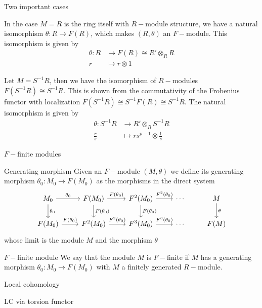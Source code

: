 \documentclass{beamer}
\begin{document}
\begin{frame}[fragile]{Two important cases}
\begin{block}{}
  In the case $M=R$ is the ring itself with  $R-$module structure, we have a natural isomorphism  $\theta : R \to F(R)$, which makes $(R, \theta )$ an $F-$module. This isomorphism is given by
  \begin{align*}
	\theta : R &\to F(R)\cong R' \otimes _R R \\
	r &\mapsto r \otimes 1
  \end{align*}
\end{block}
\begin{block}{}
Let  $M=S ^{-1}R$, then we have the isomorphism of $R-$modules $F(S^{-1}R)\cong S^{-1}R$. This is shown from the commutativity of the Frobenius functor with localization $F(S^{-1}R)\cong S^{-1}F(R)\cong S^{-1}R$. The natural isomorphism is given by
   \begin{align*}
	\theta : S ^{-1}R & \to R'\otimes _R S ^{-1}R\\
	\frac{r}{s} &\mapsto rs ^{p-1} \otimes \frac{1}{s}
   \end{align*}
\end{block}
\end{frame}


\begin{frame}[fragile]{$F-$finite modules}
\begin{block}{Generating morphism}
Given an $F-$module  $(M, \theta )$ we define its generating morphism  $\theta_0 :M_0 \to F(M_0)$ as the morphisms in the direct system 
\[\begin{tikzcd}
	{M_0} & {F(M_0)} & {F^2(M_0)} & \cdots & M \\
	{F(M_0)} & {F^2(M_0)} & {F^3(M_0)} & \cdots & {F(M)}
	\arrow["{\theta_0}", from=1-1, to=1-2]
	\arrow["{F(\theta_0)}", from=2-1, to=2-2]
	\arrow["{F^2(\theta_0)}", from=2-2, to=2-3]
	\arrow["{F(\theta_0)}", from=1-2, to=1-3]
	\arrow["{\theta_0}", from=1-1, to=2-1]
	\arrow["{F(\theta_0)}", from=1-2, to=2-2]
	\arrow["{F(\theta_0)}", from=1-3, to=2-3]
	\arrow["{F^2(\theta_0)}", from=1-3, to=1-4]
	\arrow["{F^3(\theta_0)}", from=2-3, to=2-4]
	\arrow["\theta", from=1-5, to=2-5]
\end{tikzcd}\]
whose limit is the module $M$ and the morphism $\theta$ 
\end{block}
\begin{block}{$F-$finite module}
We say that the module $M$ is  $F-$finite if  $M$ has a generating morphism  $\theta _0 : M_0 \to F(M_0)$ with $M$ a finitely generated  $R-$module.
\end{block}
\end{frame}


\begin{frame}{Local cohomology}
  \begin{block}{LC via torsion functor}
  \end{block}
\end{frame}




\nocite{*}


\end{document}
